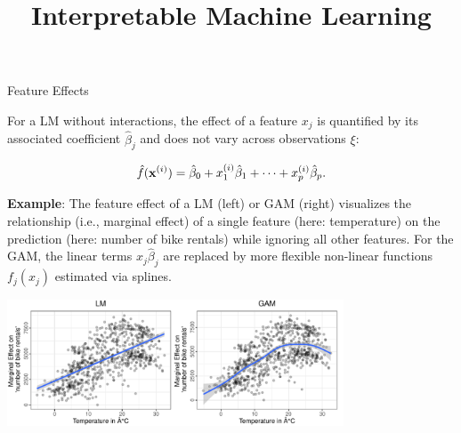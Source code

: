\documentclass[11pt,compress,t,notes=noshow, aspectratio=169, xcolor=table]{beamer}
\title{Interpretable Machine Learning}
\date{}
\begin{document}
\newcommand{\titlefigure}{figure/feature-effect}
\newcommand{\learninggoals}{
\item Introduction to feature effects
\item Understand the steps involved in constructing ICE plots
}


\begin{vbframe}{Feature Effects}

For a LM without interactions, the effect of a feature $x_j$ is quantified by its associated coefficient $\hat\beta_j$ and does not vary across observations $\xi$:

$$\fh(\xi) = \hat\beta_0 + x^{(i)}_1\hat\beta_1 + \dots + x^{(i)}_p\hat\beta_p.$$




\textbf{Example}: %
The feature effect of a LM (left) or GAM (right) visualizes the relationship (i.e., marginal effect) of a single feature (here: temperature) on the prediction (here: number of bike rentals) while ignoring all other features.
For the GAM, the linear terms $x_j\hat\beta_j$ are replaced by more flexible non-linear functions $f_j(x_j)$ estimated via splines.

\centering
\includegraphics[width=0.75\textwidth, trim=0cm 0.1cm 0cm 0cm, clip]{figure/lm_main_effects}

\end{vbframe}
\end{document}
